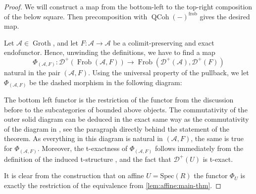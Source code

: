\documentclass{article}
\theoremstyle{definition}
\theoremstyle{definition}
\theoremstyle{definition}
\theoremstyle{plain}
\theoremstyle{plain}
\theoremstyle{plain}
\theoremstyle{plain}
\theoremstyle{plain}
\theoremstyle{plain}
\theoremstyle{plain}
\theoremstyle{plain}
\theoremstyle{remark}
\theoremstyle{remark}
\theoremstyle{plain}
\theoremstyle{plain}
\theoremstyle{plain}
\theoremstyle{plain}
\theoremstyle{plain}
\newcommand{\id}[1]{\operatorname{id}_{#1}}
\newcommand{\cartsymb}{\arrow[dr, phantom,"\scalebox{1.5}{\color{black}$\lrcorner$}", near start, color=black]}
\newcommand{\QCoh}[1]{\operatorname{QCoh}(#1)}
\newcommand{\Frob}[2]{\operatorname{Frob}(#1, #2)}
\newcommand{\End}[1]{\operatorname{End}(#1)}
\newcommand{\Cat}[1]{\mathcal{#1}}
\newcommand{\Fun}[2]{\operatorname{Fun}({#1},{#2})}
\newcommand{\CatInf}{\operatorname{Cat}_{\infty}}
\newcommand{\Groth}{\operatorname{Groth}}
\newcommand{\frob}{\operatorname{frob}}
\begin{document}
\begin{proof}
    We will construct a map from the bottom-left to the top-right composition of the below square. Then precomposition with $\QCoh{-}^{\frob}$ gives the desired map.
    \begin{center}
    \end{center}
    Let $\Cat A \in \Groth$, and let $F \colon \Cat A \to \Cat A$ be a colimit-preserving and exact endofunctor.
    Hence, unwinding the definitions, we have to find a map
    \begin{equation*}
        \Phi_{(\Cat A, F)} \colon \Cat D^+(\Frob{\Cat A}{F}) \to \Frob{\Cat D^+(\Cat A)}{\Cat D^+(F)}
    \end{equation*}
    natural in the pair $(\Cat A, F)$.
    Using the universal property of the pullback, we let $\Phi_{(\Cat A, F)}$
    be the dashed morphism in the following diagram:
    \begin{center}
    \end{center}
    The bottom left functor is the restriction of the functor from the discussion before \cite[Theorem 5.1]{cartmod} to the subcategories of bounded above objects.
    The commutativity of the outer solid diagram can be deduced in the exact same way 
    as the commutativity of the diagram in \cite[Theorem 5.1]{cartmod}, see the paragraph directly behind the statement of the theorem.
    As everything in this diagram is natural in $(\Cat A, F)$, the same is true for $\Phi_{(\Cat A, F)}$.
    Moreover, the t-exactness of $\Phi_{(\Cat A, F)}$ follows immediately from the definition of the induced t-structure \cite[Proposition 3.3]{cartmod},
    and the fact that $\Cat D^+(U)$ is t-exact.

    It is clear from the construction that on affine $U = \mathrm{Spec}(R)$ the functor $\Phi_U$ 
    is exactly the restriction of the equivalence from \cref{lem:affine:main-thm}.
\end{proof}
\end{document}
